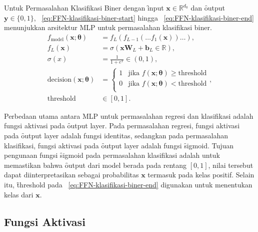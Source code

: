     Untuk Permasalahan Klasifikasi Biner dengan \f{input} $\mathbf{x}\in \mathbb{R}^{d_0}$ dan \f{output} $\mathbf{y} \in \{0, 1\}$, \equ~\ref{eq:FFN-klasifikasi-biner-start} hingga \equ~\ref{eq:FFN-klasifikasi-biner-end} menunjukkan arsitektur MLP untuk permasalahan klasifikasi biner.
    \begin{align}
        \label{eq:FFN-klasifikasi-biner-start}
        f_{\text{model}}(\mathbf{x};\bm{\theta}) &= f_L(f_{L-1}(\dots f_1(\mathbf{x})) \dots), \\
        f_L(\mathbf{x}) &= \sigma(\mathbf{x} \mathbf{W}_L + \mathbf{b}_L \in \mathbb{R}), \\
        \sigma(x) &= \frac{1}{1 + e^{x}} \in (0, 1), \\
        \text{decision}(\mathbf{x};\bm{\theta}) &= \begin{cases}
        1 & \text{jika } f(\mathbf{x};\bm{\theta}) \geq \text{threshold} \\
        0 & \text{jika } f(\mathbf{x};\bm{\theta}) < \text{threshold} \\
        \end{cases}, \\
        \label{eq:FFN-klasifikasi-biner-end}
        \text{threshold}&\in [0, 1].
    \end{align}

    Perbedaan utama antara MLP untuk permasalahan regresi dan klasifikasi adalah fungsi aktivasi pada \f{output layer}. Pada permasalahan regresi, fungsi aktivasi pada \f{output layer} adalah fungsi identitas, sedangkan pada permasalahan klasifikasi, fungsi aktivasi pada \f{output layer} adalah fungsi \f{sigmoid}. Tujuan pengunaan fungsi \f{sigmoid} pada permasalahan klasifikasi adalah untuk memastikan bahwa \f{output} dari model berada pada rentang $[0, 1]$, nilai tersebut dapat diinterpretasikan sebagai probabilitas $\mathbf{x}$ termasuk pada kelas positif. Selain itu, \f{threshold} pada \equ~\ref{eq:FFN-klasifikasi-biner-end} digunakan untuk menentukan kelas dari $\mathbf{x}$.

    \subsection{Fungsi Aktivasi}

